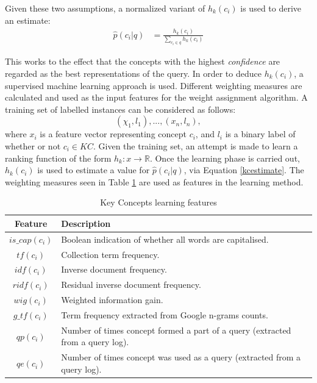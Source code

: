 \documentclass[a4paper]{report}
\newcommand{\R}{\mathbb{R}}
\begin{document}
Given these two assumptions, a normalized variant of $h_k(c_i)$ is used to derive an estimate:
\begin{equation}
\label{kcestimate}
\begin{split}
\hat{p}(c_i|q) &= \frac{h_k(c_i)}{\sum_{c_i \in q}{h_k(c_i)}}
\end{split}
\end{equation}

This works to the effect that the concepts with the highest \textit{confidence} are regarded as the best representations of the query. In order to deduce $h_k(c_i)$, a supervised machine learning approach is used. Different weighting measures are calculated and used as the input features for the weight assignment algorithm. A training set of labelled instances can be considered as follows:
$$(\chi_1,l_1), ..., (x_n,l_n),$$
where $x_i$ is a feature vector representing concept $c_i$, and $l_i$ is a binary label of whether or not $c_i \in KC$. Given the training set, an attempt is made to learn a ranking function of the form $h_k: x \rightarrow \R$. Once the learning phase is carried out, $h_k(c_i)$ is used to estimate a value for $\hat{p}(c_i|q)$, via Equation \ref{kcestimate}. The weighting measures seen in Table \ref{kc-features} are used as features in the learning method.

\begin{table}
\caption{Key Concepts learning features}
\begin{center}
  \begin{tabular}{ | c | l | }
  	\hline
    \textbf{Feature} & \textbf{Description}\\
    \hline 
    $is\_cap(c_i)$ & Boolean indication of whether all words are capitalised. \\
    $tf(c_i)$ & Collection term frequency. \\
    $idf(c_i)$ & Inverse document frequency. \\
    $ridf(c_i)$ & Residual inverse document frequency. \\
    $wig(c_i)$ & Weighted information gain. \\
    $g\_tf(c_i)$ & Term frequency extracted from Google n-grams counts. \\
    $qp(c_i)$ & Number of times concept formed a part of a query (extracted from a query log). \\
    $qe(c_i)$ & Number of times concept was used as a query (extracted from a query log). \\
    \hline
  \end{tabular}
\end{center}
\label{kc-features}
\end{table}
\end{document}
